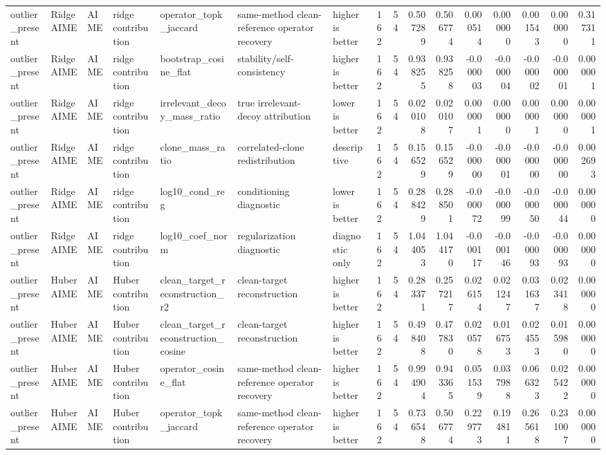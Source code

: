 \begin{table}[t]
\begin{tabular}{lllllllrrrrrrrrr}
outlier_present & RidgeAIME & AIME & ridge contribution & operator_topk_jaccard & same-method clean-reference operator recovery & higher is better & 162 & 54 & 0.507289 & 0.506774 & 0.000514 & 0.000000 & 0.001543 & 0.000000 & 0.317311 \\
outlier_present & RidgeAIME & AIME & ridge contribution & bootstrap_cosine_flat & stability/self-consistency & higher is better & 162 & 54 & 0.938255 & 0.938258 & -0.000003 & -0.000004 & -0.000002 & -0.000001 & 0.000001 \\
outlier_present & RidgeAIME & AIME & ridge contribution & irrelevant_decoy_mass_ratio & true irrelevant-decoy attribution & lower is better & 162 & 54 & 0.020108 & 0.020107 & 0.000001 & 0.000000 & 0.000001 & 0.000000 & 0.000001 \\
outlier_present & RidgeAIME & AIME & ridge contribution & clone_mass_ratio & correlated-clone redistribution & descriptive & 162 & 54 & 0.156529 & 0.156529 & -0.000000 & -0.000001 & -0.000000 & -0.000000 & 0.002693 \\
outlier_present & RidgeAIME & AIME & ridge contribution & log10_cond_reg & conditioning diagnostic & lower is better & 162 & 54 & 0.288429 & 0.288501 & -0.000072 & -0.000099 & -0.000050 & -0.000044 & 0.000000 \\
outlier_present & RidgeAIME & AIME & ridge contribution & log10_coef_norm & regularization diagnostic & diagnostic only & 162 & 54 & 1.044053 & 1.044170 & -0.000117 & -0.000146 & -0.000093 & -0.000093 & 0.000000 \\
outlier_present & HuberAIME & AIME & Huber contribution & clean_target_reconstruction_r2 & clean-target reconstruction & higher is better & 162 & 54 & 0.283371 & 0.257217 & 0.026154 & 0.021247 & 0.031637 & 0.023418 & 0.000000 \\
outlier_present & HuberAIME & AIME & Huber contribution & clean_target_reconstruction_cosine & clean-target reconstruction & higher is better & 162 & 54 & 0.498408 & 0.477830 & 0.020578 & 0.016753 & 0.024553 & 0.015980 & 0.000000 \\
outlier_present & HuberAIME & AIME & Huber contribution & operator_cosine_flat & same-method clean-reference operator recovery & higher is better & 162 & 54 & 0.994904 & 0.943365 & 0.051539 & 0.037988 & 0.066323 & 0.025422 & 0.000000 \\
outlier_present & HuberAIME & AIME & Huber contribution & operator_topk_jaccard & same-method clean-reference operator recovery & higher is better & 162 & 54 & 0.736548 & 0.506774 & 0.229773 & 0.194811 & 0.265618 & 0.231007 & 0.000000 \\

\end{tabular}
\end{table}
